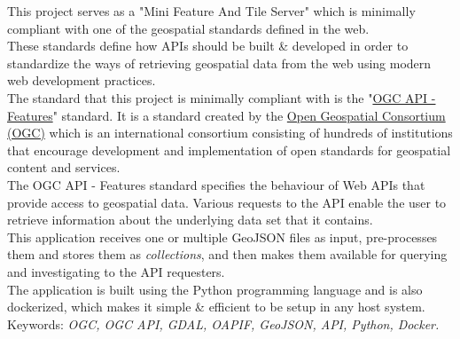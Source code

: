 This project serves as a "Mini Feature And Tile Server" which is minimally compliant with one of the geospatial standards defined in the web.\\
These standards define how APIs should be built \& developed in order to standardize the ways of retrieving geospatial data from the web using modern web development practices.\\
\newline
The standard that this project is minimally compliant with is the "\href{https://docs.opengeospatial.org/is/17-069r3/17-069r3.html}{OGC API - Features}" standard. It is a standard created by the \href{https://www.opengeospatial.org/}{Open Geospatial Consortium (OGC)} which is an international consortium consisting of hundreds of institutions that encourage development and implementation of open standards for geospatial content and services. \\
The OGC API - Features standard specifies the behaviour of Web APIs that provide access to geospatial data. Various requests to the API enable the user to retrieve information about the underlying data set that it contains.\\
This application receives one or multiple GeoJSON files as input, pre-processes them and stores them as \textit{collections}, and then makes them available for querying and investigating to the API requesters.\\

The application is built using the Python programming language and is also dockerized, which makes it simple \& efficient to be setup in any host system.\\
\newline
Keywords: \textit{OGC, OGC API, GDAL, OAPIF, GeoJSON, API, Python, Docker.}
